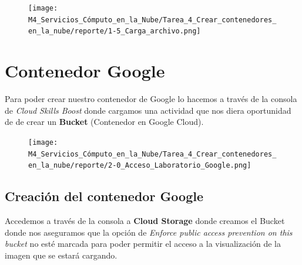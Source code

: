 \documentclass[12pt,a4paper]{article}
\begin{document}
\begin{figure}[H]
    \centering
    \texttt{[image: M4\_Servicios\_Cómputo\_en\_la\_Nube/Tarea\_4\_Crear\_contenedores\_en\_la\_nube/reporte/1-5\_Carga\_archivo.png]}
    \label{fig:Azure_5}
\end{figure}

\vspace{5cm}

\section{Contenedor Google}

Para poder crear nuestro contenedor de Google lo hacemos a través de la consola de \textit{Cloud Skills Boost} donde cargamos una actividad que nos diera oportunidad de de crear un \textbf{Bucket} (Contenedor en Google Cloud).

\begin{figure}[H]
    \centering
    \texttt{[image: M4\_Servicios\_Cómputo\_en\_la\_Nube/Tarea\_4\_Crear\_contenedores\_en\_la\_nube/reporte/2-0\_Acceso\_Laboratorio\_Google.png]}
    \label{fig:Google_0}
\end{figure}

\vspace{5cm}

\subsection{Creación del contenedor Google}

Accedemos a través de la consola a \textbf{Cloud Storage} donde creamos el Bucket donde nos aseguramos que la opción de \textit{Enforce public access prevention on this bucket} no esté marcada para poder permitir el acceso a la visualización de la imagen que se estará cargando.
\end{document}
